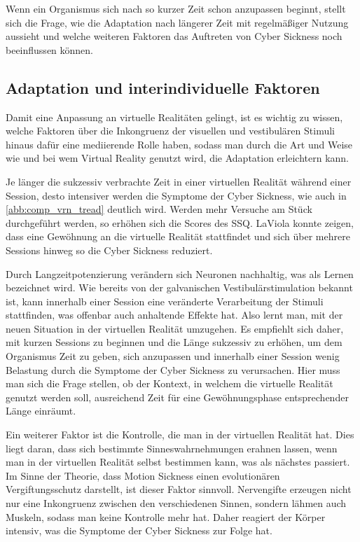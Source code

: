 Wenn ein Organismus sich nach so kurzer Zeit schon anzupassen beginnt, stellt sich die Frage, wie die Adaptation nach l\"angerer Zeit mit regelm\"a{\ss}iger Nutzung aussieht und welche weiteren Faktoren das Auftreten von Cyber Sickness noch beeinflussen k\"onnen.

\subsection{Adaptation und interindividuelle Faktoren}\label{Adaptation}

Damit eine Anpassung an virtuelle Realit\"aten gelingt, ist es wichtig zu wissen, welche Faktoren \"uber die Inkongruenz der visuellen und vestibul\"aren Stimuli hinaus daf\"ur eine mediierende Rolle haben, sodass man durch die Art und Weise wie und bei wem Virtual Reality genutzt wird, die Adaptation erleichtern kann.

Je l\"anger die sukzessiv verbrachte Zeit in einer virtuellen Realit\"at w\"ahrend einer Session, desto intensiver werden die Symptome der Cyber Sickness\cite{Aldaba:2017:VRNTreadGraphic}, wie auch in \autoref{abb:comp_vrn_tread} deutlich wird. Werden mehr Versuche am St\"uck durchgef\"uhrt werden, so erh\"ohen sich die Scores des SSQ. LaViola\cite{LaViola:2000:CSinVR} konnte zeigen, dass eine Gew\"ohnung an die virtuelle Realität stattfindet und sich \"uber mehrere Sessions hinweg so die Cyber Sickness reduziert.

Durch Langzeitpotenzierung ver\"andern sich Neuronen nachhaltig, was als Lernen bezeichnet wird. 
Wie bereits von der galvanischen Vestibul\"arstimulation bekannt ist, kann innerhalb einer Session eine ver\"anderte Verarbeitung der Stimuli stattfinden, was offenbar auch anhaltende Effekte hat. Also lernt man, mit der neuen Situation in der virtuellen Realit\"at umzugehen.
Es empfiehlt sich daher, mit kurzen Sessions zu beginnen und die L\"ange sukzessiv zu erh\"ohen, um dem Organismus Zeit zu geben, sich anzupassen und innerhalb einer Session wenig Belastung durch die Symptome der Cyber Sickness zu verursachen.
Hier muss man sich die Frage stellen, ob der Kontext, in welchem die virtuelle Realit\"at genutzt werden soll, ausreichend Zeit f\"ur eine Gew\"ohnungsphase entsprechender Länge einr\"aumt.

Ein weiterer Faktor ist die Kontrolle, die man in der virtuellen Realit\"at hat\cite{Kolasinski:1995:control}. Dies liegt daran, dass sich bestimmte Sinneswahrnehmungen erahnen lassen, wenn man in der virtuellen Realit\"at selbst bestimmen kann, was als n\"achstes passiert. Im Sinne der Theorie, dass Motion Sickness einen evolution\"aren Vergiftungsschutz darstellt, ist dieser Faktor sinnvoll. Nervengifte erzeugen nicht nur eine Inkongruenz zwischen den verschiedenen Sinnen, sondern l\"ahmen auch Muskeln, sodass man keine Kontrolle mehr hat. Daher reagiert der K\"orper intensiv, was die Symptome der Cyber Sickness zur Folge hat.

